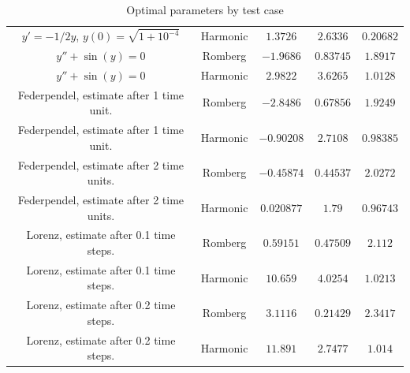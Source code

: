 \begin{table}[H]
\begin{tabular}{c|c||c|c|c}
$y' = -1/2y$, $y(0) = \sqrt{1+10^{-4}}$ & Harmonic & \(1.3726\) & \(2.6336\) & \(0.20682\) \\
$y'' + \sin(y) = 0$ & Romberg & \(-1.9686\) & \(0.83745\) & \(1.8917\) \\
$y'' + \sin(y) = 0$ & Harmonic & \(2.9822\) & \(3.6265\) & \(1.0128\) \\
Federpendel, estimate after 1 time unit. & Romberg & \(-2.8486\) & \(0.67856\) & \(1.9249\) \\
Federpendel, estimate after 1 time unit. & Harmonic & \(-0.90208\) & \(2.7108\) & \(0.98385\) \\
Federpendel, estimate after 2 time units. & Romberg & \(-0.45874\) & \(0.44537\) & \(2.0272\) \\
Federpendel, estimate after 2 time units. & Harmonic & \(0.020877\) & \(1.79\) & \(0.96743\) \\
Lorenz, estimate after 0.1 time steps. & Romberg & \(0.59151\) & \(0.47509\) & \(2.112\) \\
Lorenz, estimate after 0.1 time steps. & Harmonic & \(10.659\) & \(4.0254\) & \(1.0213\) \\
Lorenz, estimate after 0.2 time steps. & Romberg & \(3.1116\) & \(0.21429\) & \(2.3417\) \\
Lorenz, estimate after 0.2 time steps. & Harmonic & \(11.891\) & \(2.7477\) & \(1.014\) \\
    \end{tabular}
    \caption{Optimal parameters by test case}
    \label{tab:my_label}
\end{table}